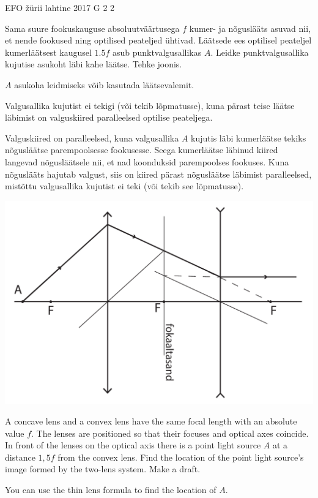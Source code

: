 {EFO žürii} %
{lahtine} %
{2017} %
{G 2} %
{2} %
{
\ifStatement
Sama suure fookuskauguse absoluutväärtusega $f$ kumer- ja nõguslääts asuvad nii, et nende fookused ning optilised peateljed ühtivad. Läätsede ees optilisel peateljel kumerläätsest kaugusel $\num{1,5}f$ asub punktvalgusallikas $A$. Leidke punktvalgusallika kujutise asukoht läbi kahe läätse. Tehke joonis.
\fi


\ifHint
$A$ asukoha leidmiseks võib kasutada läätsevalemit.
\fi


\ifSolution
Valgusallika kujutist ei tekigi (või tekib lõpmatusse), kuna pärast teise läätse läbimist on valguskiired paralleelsed optilise peateljega.

Valguskiired on paralleelsed, kuna valgusallika $A$ kujutis läbi kumerläätse tekiks nõgusläätse parempoolsesse fookusesse. Seega kumerläätse läbinud kiired langevad nõgusläätsele nii, et nad koonduksid parempoolses fookuses. Kuna nõguslääts hajutab valgust, siis on kiired pärast nõgusläätse läbimist paralleelsed, mistõttu valgusallika kujutist ei teki (või tekib see lõpmatusse).

\begin{center}
	\includegraphics[width=0.7\linewidth]{2017-lahg-02-valgusallikaslah}
\end{center}
\fi


\ifEngStatement
A concave lens and a convex lens have the same focal length with an absolute value $f$. The lenses are positioned so that their focuses and optical axes coincide. In front of the lenses on the optical axis there is a point light source $A$ at a distance $1,5f$ from the convex lens. Find the location of the point light source's image formed by the two-lens system. Make a draft.
\fi


\ifEngHint
You can use the thin lens formula to find the location of $A$.
\fi


}
